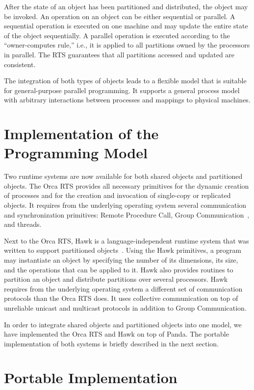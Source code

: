 \documentclass{article}
\begin{document}
After the state of an object has been partitioned and distributed, the
object may be invoked. An operation on an object can be either
sequential or parallel. A sequential operation is executed on one
machine and may update the entire state of the object sequentially. A
parallel operation is executed according to the ``owner-computes
rule,'' i.e., it is applied to all partitions owned by the processors in
parallel. The RTS guarantees that all partitions accessed and updated
are consistent. 

The integration of both types of objects leads to a flexible model
that is suitable for general-purpose parallel programming. It supports
a general process model with arbitrary interactions between processes
and mappings to physical machines.

\section{Implementation of the Programming Model}

Two runtime systems are now available for both shared objects and
partitioned objects. The Orca RTS provides all necessary primitives
for the dynamic creation of processes and for the creation and
invocation of single-copy or replicated objects. It requires from the
underlying operating system several communication and synchronization
primitives: Remote Procedure Call, Group
Communication~\cite{kaashoek92}, and threads.

Next to the Orca RTS, Hawk is a language-independent runtime system
that was written to support partitioned
objects~\cite{benhassen96}. Using the Hawk primitives, a program may
instantiate an object by specifying the number of its dimensions, its
size, and the operations that can be applied to it. Hawk also provides
routines to partition an object and distribute partitions over several
processors. Hawk requires from the underlying operating system a
different set of communication protocols than the Orca RTS does. It
uses collective communication on top of unreliable unicast and
multicast protocols in addition to Group Communication.

In order to integrate shared objects and partitioned objects
into one model, we have implemented the Orca RTS and Hawk on top of
Panda.  The portable implementation of both systems is briefly
described in the next section.

\section{Portable Implementation}
\end{document}
